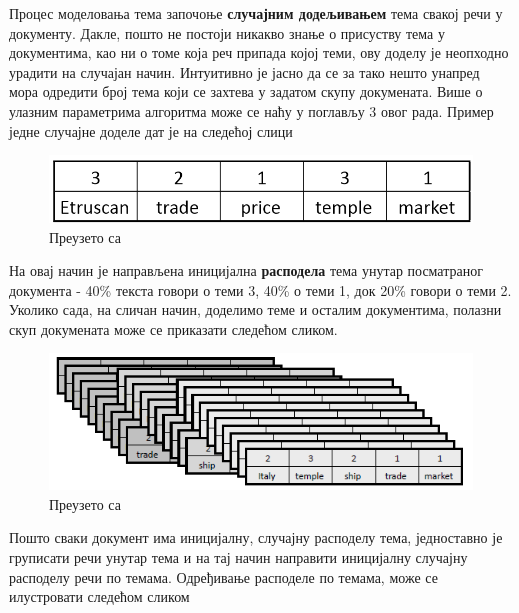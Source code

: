 Процес моделовања тема започоње \textbf{случајним додељивањем} тема свакој речи у документу. Дакле, пошто не постоји никакво знање о присуству тема у документима, као ни о томе која реч припада којој теми, ову доделу је неопходно урадити на случајан начин. Интуитивно је јасно да се за тако нешто унапред мора одредити број тема који се захтева у задатом скупу докумената. Више о улазним параметрима алгоритма може се наћу у поглављу 3 овог рада. Пример једне случајне доделе дат је на следећој слици 
\begin{figure}[H]
    \centering
   \includegraphics[scale=0.6]{./Slike/slika4.png} 
	\caption{Преузето са \cite{mimno1}}
	\label{fig:slika4}
\end{figure}

На овај начин је направљена иницијална \textbf{расподела} тема унутар посматраног документа - 40\% текста говори о теми 3, 40\% о теми 1, док 20\% говори о теми 2. Уколико сада, на сличан начин, доделимо теме и осталим документима, полазни скуп докумената може се приказати следећом сликом.

\begin{figure}[H]
    \centering
   \includegraphics[scale=0.6]{./Slike/slika5.png} 
	\caption{Преузето са \cite{mimno1}}
	\label{fig:slika5}
\end{figure}

Пошто сваки документ има иницијалну, случајну расподелу тема, једноставно је груписати речи унутар тема и на тај начин направити иницијалну случајну расподелу речи по темама. Одређивање расподеле по темама, може се илустровати следећом сликом 

